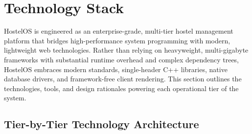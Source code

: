 \documentclass[12pt,a4paper]{article}
\begin{document}
\section{Technology Stack}
\label{sec:tech_stack}
HostelOS is engineered as an enterprise-grade, multi-tier hostel management platform that bridges high-performance system programming with modern, lightweight web technologies. Rather than relying on heavyweight, multi-gigabyte frameworks with substantial runtime overhead and complex dependency trees, HostelOS embraces modern standards, single-header C++ libraries, native database drivers, and framework-free client rendering. This section outlines the technologies, tools, and design rationales powering each operational tier of the system.

\subsection{Tier-by-Tier Technology Architecture}
\label{sec:tech_tiers}
\end{document}
